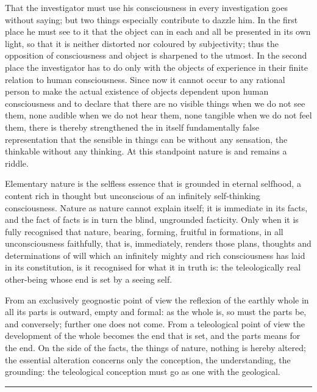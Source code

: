 \documentclass[12pt,a4paper]{book}
\newcommand{\streg}{\begin{center}\rule{2cm}{0.4pt}\end{center}}
\begin{document}
That the investigator must use his consciousness in every investigation goes without saying; but two things especially
contribute to dazzle him. In the first place he must see to it that the object can in each and all be presented in its
own light, so that it is neither distorted nor coloured by subjectivity; thus the opposition of consciousness and object
is sharpened to the utmost. In the second place the investigator has to do only with the objects of experience in their
finite relation to human consciousness. Since now it cannot occur to any rational person to make the
actual existence of objects dependent upon human consciousness and to declare that there are no visible things when we
do not see them, none audible when we do not hear them, none tangible when we do not feel them, there is thereby
strengthened the in itself fundamentally false representation that the sensible in things can be without any sensation,
the thinkable without any thinking. At this standpoint nature is and remains a riddle.

Elementary nature is the selfless essence that is grounded in eternal selfhood, a content rich in thought but unconscious
of an infinitely self-thinking consciousness. Nature as nature cannot explain itself; it is immediate in its facts, and
the fact of facts is in turn the blind, ungrounded facticity. Only when it is fully recognised that nature, bearing,
forming, fruitful in formations, in all unconsciousness faithfully, that is, immediately, renders those plans, thoughts
and determinations of will which an infinitely mighty and rich consciousness has laid in its constitution, is it
recognised for what it in truth is: the teleologically real other-being whose end is set by a seeing self.

From an exclusively geognostic point of view the reflexion of the earthly whole in all its parts is outward, empty and
formal: as the whole is, so must the parts be, and conversely; further one does not come. From a teleological point of
view the development of the whole becomes the end that is set, and the parts means for the end. On the side of the facts,
the things of nature, nothing is hereby altered; the essential alteration concerns only the conception, the
understanding, the grounding: the teleological conception must go as one with the geological.

\streg
\end{document}
